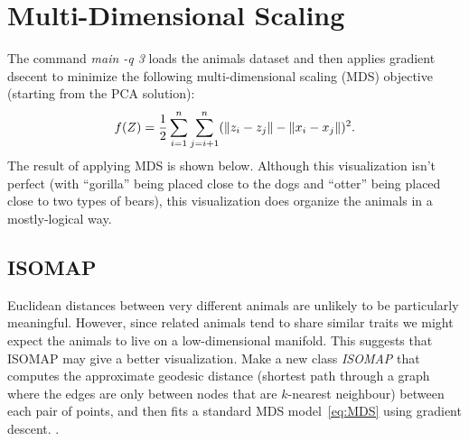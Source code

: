 \documentclass{article}
\begin{document}


\section{Multi-Dimensional Scaling}

The command \emph{main -q 3} loads the animals dataset and then applies gradient dsecent to minimize the following multi-dimensional scaling (MDS) objective (starting from the PCA solution):
\begin{equation}
\label{eq:MDS}
f(Z) =  \frac{1}{2}\sum_{i=1}^n\sum_{j=i+1}^n (  \|z_i - z_j\| - \|x_i - x_j\|)^2.
\end{equation}
 The result of applying MDS is shown below.
Although this visualization isn't perfect (with ``gorilla'' being placed close to the dogs and ``otter'' being placed close to two types of bears), this visualization does organize the animals in a mostly-logical way.


\subsection{ISOMAP}

Euclidean distances between very different animals are unlikely to be particularly meaningful. However, since related animals tend to share similar traits we might expect the animals to live on a low-dimensional manifold. This suggests that ISOMAP may give a better visualization. 
Make a new class \emph{ISOMAP} that computes the approximate geodesic distance (shortest path through a graph where the edges are only between nodes that are $k$-nearest neighbour) between each pair of points, and then fits a standard MDS model~\eqref{eq:MDS} using gradient descent. .
\end{document}
